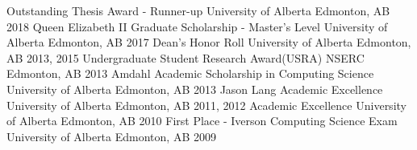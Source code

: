 \begin{cvhonors}
    \cvhonor
    {Outstanding Thesis Award - Runner-up}
    {University of Alberta}
    {Edmonton, AB}
    {2018}
    \cvhonor
    {Queen Elizabeth II Graduate Scholarship - Master's Level}
    {University of Alberta}
    {Edmonton, AB}
    {2017}
    \cvhonor
    {Dean's Honor Roll}
    {University of Alberta}
    {Edmonton, AB}
    {2013, 2015}
    \cvhonor
    {Undergraduate Student Research Award(USRA)}
    {NSERC}
    {Edmonton, AB}
    {2013}
    \cvhonor
    {Amdahl Academic Scholarship in Computing Science}
    {University of Alberta}
    {Edmonton, AB}
    {2013}
    \cvhonor
    {Jason Lang Academic Excellence}
    {University of Alberta}
    {Edmonton, AB}
    {2011, 2012}
    \cvhonor
    {Academic Excellence}
    {University of Alberta}
    {Edmonton, AB}
    {2010}
    \cvhonor
    {First Place - Iverson Computing Science Exam}
    {University of Alberta}
    {Edmonton, AB}
    {2009}
\end{cvhonors}

